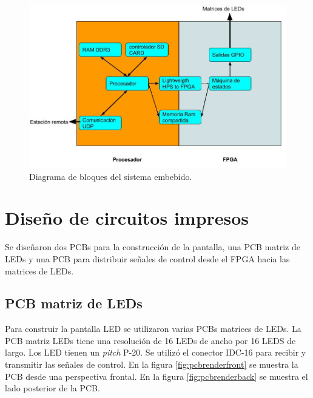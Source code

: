\begin{figure}[htpb]
	\centering
	\includegraphics[scale=2]{Figures/Diagramabloques.jpg} 
	\caption{Diagrama de bloques del sistema embebido.}
	\label{fig:bloques embebido}
\end{figure}






\section{ Diseño de circuitos impresos}
Se diseñaron dos PCBs para la construcción de la pantalla, una PCB matriz de LEDs y una PCB para distribuir señales de control desde el FPGA hacia las matrices de LEDs.
\subsection{PCB matriz de LEDs}
Para construir la pantalla LED se utilizaron varias PCBs matrices de LEDs. La PCB matriz LEDs tiene una resolución de 16 LEDs de ancho por 16 LEDS de largo. Los LED tienen un \textit{pitch} P-20. Se utilizó el conector IDC-16 para recibir y transmitir las señales de control. En la figura \ref{fig:pcbrenderfront}  se muestra la PCB desde una perspectiva frontal. En la figura \ref{fig:pcbrenderback} se muestra el lado posterior de la PCB.


